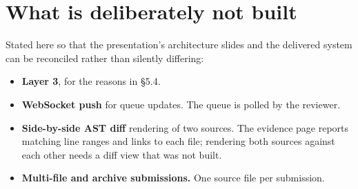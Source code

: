 \hypertarget{what-is-deliberately-not-built}{%
\section{What is deliberately not
built}\label{what-is-deliberately-not-built}}

Stated here so that the presentation's architecture slides and the
delivered system can be reconciled rather than silently differing:

\begin{itemize}
\tightlist
\item
  \textbf{Layer 3}, for the reasons in \S{}5.4.
\item
  \textbf{WebSocket push} for queue updates. The queue is polled by the
  reviewer.
\item
  \textbf{Side-by-side AST diff} rendering of two sources. The evidence
  page reports matching line ranges and links to each file; rendering
  both sources against each other needs a diff view that was not built.
\item
  \textbf{Multi-file and archive submissions.} One source file per
  submission.
\end{itemize}
